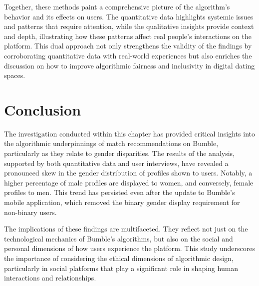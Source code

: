 Together, these methods paint a comprehensive picture of the algorithm's behavior and its effects on users. The quantitative data highlights systemic issues and patterns that require attention, while the qualitative insights provide context and depth, illustrating how these patterns affect real people's interactions on the platform. This dual approach not only strengthens the validity of the findings by corroborating quantitative data with real-world experiences but also enriches the discussion on how to improve algorithmic fairness and inclusivity in digital dating spaces.

\section{Conclusion}   
The investigation conducted within this chapter has provided critical insights into the algorithmic underpinnings of match recommendations on Bumble, particularly as they relate to gender disparities. The results of the analysis, supported by both quantitative data and user interviews, have revealed a pronounced skew in the gender distribution of profiles shown to users. Notably, a higher percentage of male profiles are displayed to women, and conversely, female profiles to men. This trend has persisted even after the update to Bumble's mobile application, which removed the binary gender display requirement for non-binary users.

The implications of these findings are multifaceted. They reflect not just on the technological mechanics of Bumble's algorithms, but also on the social and personal dimensions of how users experience the platform. This study underscores the importance of considering the ethical dimensions of algorithmic design, particularly in social platforms that play a significant role in shaping human interactions and relationships.